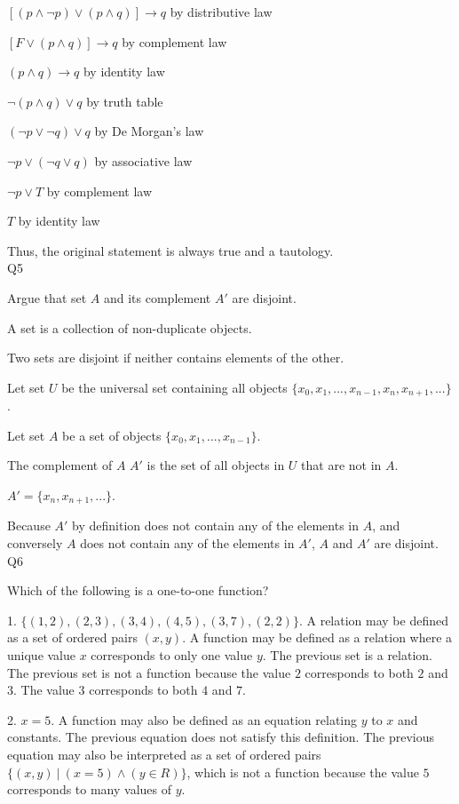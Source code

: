 \documentclass{article}
\begin{document}
\([(p \land \neg p) \lor (p \land q)] \rightarrow q\) by distributive law

\([F \lor (p \land q)] \rightarrow q\) by complement law

\((p \land q) \rightarrow q\) by identity law

\(\neg (p \land q) \lor q\) by truth table

\((\neg p \lor \neg q) \lor q\) by De Morgan's law

\(\neg p \lor (\neg q \lor q)\) by associative law

\(\neg p \lor T\) by complement law

\(T\) by identity law

Thus, the original statement is always true and a tautology.\\

Q5

Argue that set \(A\) and its complement \(A'\) are disjoint.

A set is a collection of non-duplicate objects.

Two sets are disjoint if neither contains elements of the other.

Let set \(U\) be the universal set containing all objects \(\{x_0, x_1, ..., x_{n-1}, x_n, x_{n+1}, ...\}\).

Let set \(A\) be a set of objects \(\{x_0, x_1, ..., x_{n-1}\}\).

The complement of \(A\) \(A'\) is the set of all objects in \(U\) that are not in \(A\).

\(A' = \{x_n, x_{n+1}, ...\}\).

Because \(A'\) by definition does not contain any of the elements in \(A\), and conversely \(A\) does not contain any of the elements in \(A'\), \(A\) and \(A'\) are disjoint.\\

Q6

Which of the following is a one-to-one function?

1. \(\{(1, 2), (2, 3), (3, 4), (4, 5), (3, 7), (2, 2)\}\). A relation may be defined as a set of ordered pairs \((x, y)\). A function may be defined as a relation where a unique value \(x\) corresponds to only one value \(y\). The previous set is a relation. The previous set is not a function because the value \(2\) corresponds to both \(2\) and \(3\). The value \(3\) corresponds to both \(4\) and \(7\).

2. \(x = 5\). A function may also be defined as an equation relating \(y\) to \(x\) and constants. The previous equation does not satisfy this definition. The previous equation may also be interpreted as a set of ordered pairs \(\{(x, y) \ | \ (x = 5) \land (y \in R)\}\), which is not a function because the value \(5\) corresponds to many values of \(y\).
\end{document}
